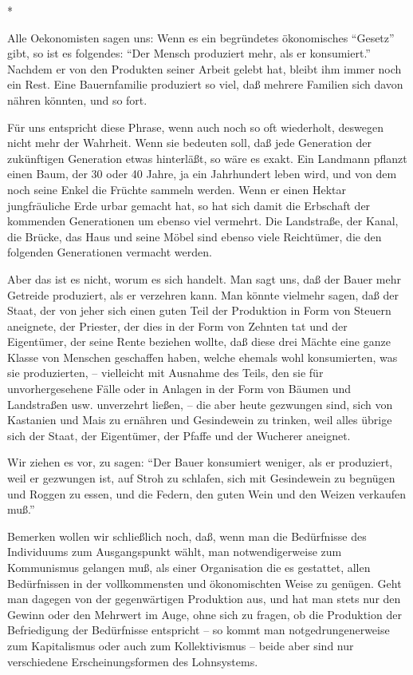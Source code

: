 \documentclass{scrbook}
\begin{document}
\begin{center}*\end{center}

Alle Oekonomisten sagen uns: Wenn es ein begründetes ökonomisches ``Gesetz'' gibt, so ist es folgendes: ``Der Mensch produziert mehr, als er konsumiert.'' Nachdem er von den Produkten seiner Arbeit gelebt hat, bleibt ihm immer noch ein Rest. Eine Bauernfamilie produziert so viel, daß mehrere Familien sich davon nähren könnten, und so fort.

Für uns entspricht diese Phrase, wenn auch noch so oft wiederholt, deswegen nicht mehr der Wahrheit. Wenn sie bedeuten soll, daß jede Generation der zukünftigen Generation etwas hinterläßt, so wäre es exakt. Ein Landmann pflanzt einen Baum, der 30 oder 40 Jahre, ja ein Jahrhundert leben wird, und von dem noch seine Enkel die Früchte sammeln werden. Wenn er einen Hektar jungfräuliche Erde urbar gemacht hat, so hat sich damit die Erbschaft der kommenden Generationen um ebenso viel vermehrt. Die Landstraße, der Kanal, die Brücke, das Haus und seine Möbel sind ebenso viele Reichtümer, die den folgenden Generationen vermacht werden.

Aber das ist es nicht, worum es sich handelt. Man sagt uns, daß der Bauer mehr Getreide produziert, als er verzehren kann. Man könnte vielmehr sagen, daß der Staat, der von jeher sich einen guten Teil der Produktion in Form von Steuern aneignete, der Priester, der dies in der Form von Zehnten tat und der Eigentümer, der seine Rente beziehen wollte, daß diese drei Mächte eine ganze Klasse von Menschen geschaffen haben, welche ehemals wohl konsumierten, was sie produzierten, – vielleicht mit Ausnahme des Teils, den sie für unvorhergesehene Fälle oder in Anlagen in der Form von Bäumen und Landstraßen usw. unverzehrt ließen, – die aber heute gezwungen sind, sich von Kastanien und Mais zu ernähren und Gesindewein zu trinken, weil alles übrige sich der Staat, der Eigentümer, der Pfaffe und der Wucherer aneignet.

Wir ziehen es vor, zu sagen: ``Der Bauer konsumiert weniger, als er produziert, weil er gezwungen ist, auf Stroh zu schlafen, sich mit Gesindewein zu begnügen und Roggen zu essen, und die Federn, den guten Wein und den Weizen verkaufen muß.''

Bemerken wollen wir schließlich noch, daß, wenn man die Bedürfnisse des Individuums zum Ausgangspunkt wählt, man notwendigerweise zum Kommunismus gelangen muß, als einer Organisation die es gestattet, allen Bedürfnissen in der vollkommensten und ökonomischten Weise zu genügen. Geht man dagegen von der gegenwärtigen Produktion aus, und hat man stets nur den Gewinn oder den Mehrwert im Auge, ohne sich zu fragen, ob die Produktion der Befriedigung der Bedürfnisse entspricht – so kommt man notgedrungenerweise zum Kapitalismus oder auch zum Kollektivismus – beide aber sind nur verschiedene Erscheinungsformen des Lohnsystems.
\end{document}
